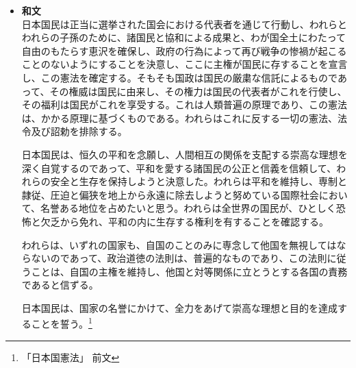 \documentclass[a4paper,10pt]{ltjsarticle}
\begin{document}
\begin{itemize} 
  \item[]
\textbf{和文}\\
\hspace{3mm} 日本国民は正当に選挙された国会における代表者を通じて行動し、われらとわれらの子孫のために、諸国民と協和による成果と、わが国全土にわたって自由のもたらす恵沢を確保し、政府の行為によって再び戦争の惨禍が起こることのないようにすることを決意し、ここに主権が国民に存することを宣言し、この憲法を確定する。そもそも国政は国民の厳粛な信託によるものであって、その権威は国民に由来し、その権力は国民の代表者がこれを行使し、その福利は国民がこれを享受する。これは人類普遍の原理であり、この憲法は、かかる原理に基づくものである。われらはこれに反する一切の憲法、法令及び詔勅を排除する。\par

\hspace{3mm} 日本国民は、恒久の平和を念願し、人間相互の関係を支配する崇高な理想を深く自覚するのであって、平和を愛する諸国民の公正と信義を信頼して、われらの安全と生存を保持しようと決意した。われらは平和を維持し、専制と隷従、圧迫と偏狭を地上から永遠に除去しようと努めている国際社会において、名誉ある地位を占めたいと思う。われらは全世界の国民が、ひとしく恐怖と欠乏から免れ、平和の内に生存する権利を有することを確認する。\par

\hspace{3mm} われらは、いずれの国家も、自国のことのみに専念して他国を無視してはならないのであって、政治道徳の法則は、普遍的なものであり、この法則に従うことは、自国の主権を維持し、他国と対等関係に立とうとする各国の責務であると信ずる。\par

日本国民は、国家の名誉にかけて、全力をあげて崇高な理想と目的を達成することを誓う。\footnote{「日本国憲法」 前文}\vspace{2mm}
 \par 



\end{itemize}
\end{document}
